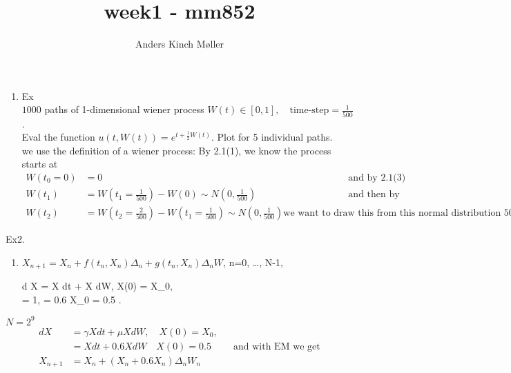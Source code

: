 \documentclass[danish,a4paper,11pt]{article}
\title{week1 - mm852}
\author{Anders Kinch Møller}
\date{}
\begin{document}
\maketitle
\begin{enumerate}
  \item Ex \\
    \( 1000 \) paths of 1-dimensional wiener process \( W(t) \in \left[  0,1\right], \quad \text{time-step}  = \frac{1}{500} \). \\
    Eval the function \( u \left(  t,W(t)\right)  = e^{t + \frac{1}{2}W(t)} \). Plot for 5 individual paths.\\
    we use the definition of a wiener process: By 2.1(1), we know the process starts at
    \begin{align*}
      W(t_0 = 0)  &= 0 && \text{and by 2.1(3) and the size of the time step, we have}\\
      W(t_1)  &= W(t_1 = \frac{1}{500})-W(0) \sim  N \left(    0, \frac{1}{500} \right) && \text{and then by 2.1(4) (stochastic independence) we can sum } \\
      W(t_2)  &= W(t_2  = \frac{2}{500}) - W(t_1 = \frac{1}{500}) \sim N \left(  0,\frac{1}{500}\right)
      \text{we want to draw this from this normal distribution 500 times, since then 1 second has passed. We then sum all the random variables}
    \end{align*}
\end{enumerate}


Ex2. \\
\begin{enumerate}
  \item \( X_{n+1}  = X_n  + f(t_n , X_n) \Delta_n   + g(t_n, X_n) \Delta_n W\), n=0, \ldots, N-1,

  d X  = \gamma X dt  + \mu X dW, \quad X(0)  = X_0, \\
  \gamma    = 1, \mu  = 0.6  X_0  = 0.5 \in \left[  0,2 \right]. \\
\end{enumerate}
\( N = 2^{9} \)
\begin{align}
  d X  &= \gamma X dt  + \mu X dW, \quad X(0)  = X_0, \\
       & = X dt  + 0.6X dW \quad X(0)  = 0.5 && \text{and with EM we get} \\
  X_{n +1}  &  = X_n + \left(X_n +0.6X_n \right) \Delta_n W_n \\
\end{align}
\end{document}
